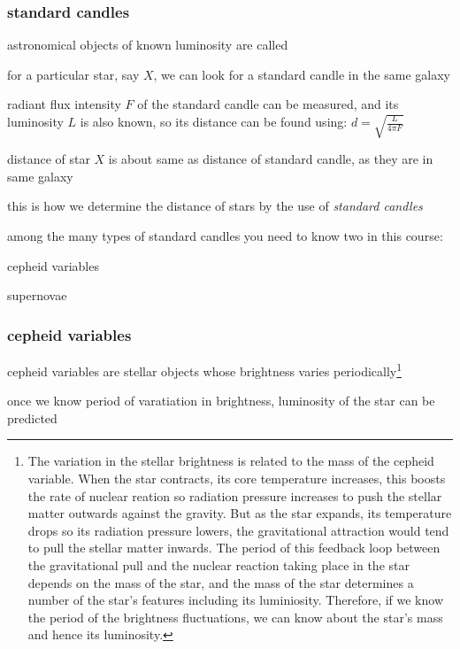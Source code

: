 \subsubsection{standard candles}

\begin{ilight}
	astronomical objects of known luminosity are called 
\end{ilight}

for a particular star, say $X$, we can look for a standard candle in the same galaxy

radiant flux intensity $F$ of the standard candle can be measured, and its luminosity $L$ is also known, so its distance can be found using: $d = \sqrt{\frac{L}{4\pi F}}$

distance of star $X$ is about same as distance of standard candle, as they are in same galaxy

this is how we determine the distance of stars by the use of \emph{standard candles}


\newpage

among the many types of standard candles you need to know two in this course:

\titem cepheid variables

\titem supernovae

\subsubsection*{cepheid variables}

cepheid variables are stellar objects whose brightness varies periodically\footnote{The variation in the stellar brightness is related to the mass of the cepheid variable. When the star contracts, its core temperature increases, this boosts the rate of nuclear reation so radiation pressure increases to push the stellar matter outwards against the gravity. But as the star expands, its temperature drops so its radiation pressure lowers, the gravitational attraction would tend to pull the stellar matter inwards. The period of this feedback loop between the gravitational pull and the nuclear reaction taking place in the star depends on the mass of the star, and the mass of the star determines a number of the star's features including its luminiosity. Therefore, if we know the period of the brightness fluctuations, we can know about the star's mass and hence its luminosity.}

once we know period of varatiation in brightness, luminosity of the star can be predicted

